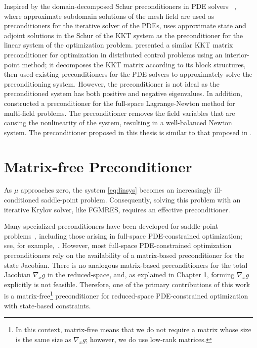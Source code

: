 Inspired by the domain-decomposed Schur preconditioners  in PDE solvers~\cite{keyes_domain} ,  where approximate subdomain solutions of the mesh field are used as preconditioners for the iterative solver of the PDEs, \cite{DBLP:journals/siamsc/BirosG05} uses approximate state and adjoint solutions in the Schur of the KKT system as the preconditioner for the linear system of the optimization problem. 
 \cite{pc_kkt_control} presented a similar KKT matrix preconditioner for  optimization in distributed control problems using an interior-point method; it decomposes the KKT matrix according to its block structures, 
then used existing preconditioners for the PDE solvers to approximately solve the preconditioning system. However, the preconditioner is not ideal as the preconditioned system has both positive and negative eigenvalues. In addition, \cite{doi:10.1137/15M104075X} constructed a preconditioner for the full-space Lagrange-Newton method for multi-field problems. The preconditioner removes the field variables that are causing the nonlinearity of the system, resulting in a well-balanced Newton system. The preconditioner proposed in this thesis is similar to  that proposed in \cite{pc_kkt_control}. 


\section{Matrix-free Preconditioner}\label{sec:matfreepc}
As $\mu$ approaches zero, the system \eqref{eq:linsys} becomes an increasingly
ill-conditioned saddle-point problem.  Consequently, solving this problem with
an iterative Krylov solver, like FGMRES, requires an effective preconditioner.  

Many specialized preconditioners have been developed for saddle-point
problems~\cite{benzi2005numerical}, including those arising in full-space
PDE-constrained optimization; see, for example,~\cite{Rees2010optimal}.
However, most full-space PDE-constrained optimization preconditioners rely on
the availability of a matrix-based preconditioner for the state Jacobian. There
is no analogous matrix-based preconditioners for the total Jacobian $\nabla_x g$
in the reduced-space, and, as explained in Chapter 1, forming $\nabla_x
g$ explicitly is not feasible.  Therefore, one of the primary contributions of
this work is a matrix-free\footnote{In this context, matrix-free means that we
  do not require a matrix whose size is the same size as $\nabla_x g$; however,
  we do use low-rank matrices.} preconditioner for reduced-space PDE-constrained
optimization with state-based constraints.

